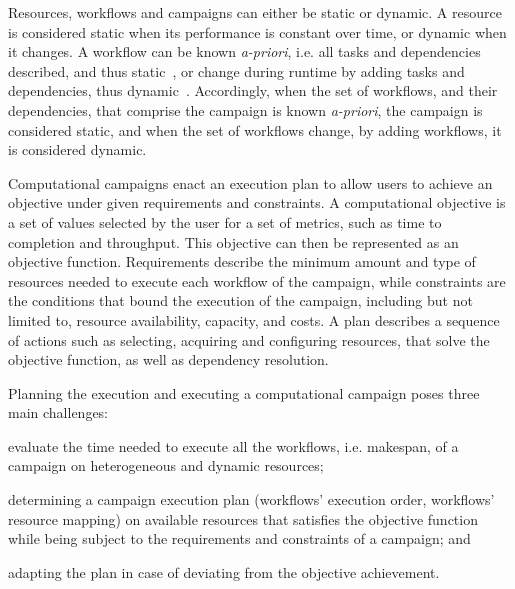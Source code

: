 Resources, workflows and campaigns can either be static or dynamic. A resource 
is considered static when its performance is constant over time, or dynamic when 
it changes. A workflow can be known \textit{a-priori}, i.e. all tasks and 
dependencies described, and thus static~\cite{paraskevakos2019workflow}, or 
change during runtime by adding tasks and dependencies, thus dynamic~\cite{dakka2018high}. 
Accordingly, when the set of workflows, and their dependencies, that comprise 
the campaign is known \textit{a-priori}, the campaign is considered static, and 
when the set of workflows change, by adding workflows, it is considered dynamic.

Computational campaigns enact an execution plan to allow users to achieve an 
objective under given requirements and constraints. A computational objective is 
a set of values selected by the user for a set of metrics, such as time to 
completion and throughput. This objective can then be represented as an objective 
function. Requirements describe the minimum amount and type of resources needed 
to execute each workflow of the campaign, while constraints are the conditions 
that bound the execution of the campaign, including but not limited to, resource 
availability, capacity, and costs. A plan describes a sequence of actions such 
as selecting, acquiring and configuring resources, that solve the objective 
function, as well as dependency resolution.

Planning the execution and executing a computational campaign poses three main 
challenges: 
\begin{inparaenum}[(i)]
\item evaluate the time needed to execute all the workflows, i.e. makespan, of 
a campaign on heterogeneous and dynamic resources;
\item determining a campaign execution plan (workflows’ execution order, 
workflows’ resource mapping) on available resources that satisfies the objective 
function while being subject to the requirements and constraints of a campaign; 
and
\item adapting the plan in case of deviating from the objective achievement.
\end{inparaenum}

